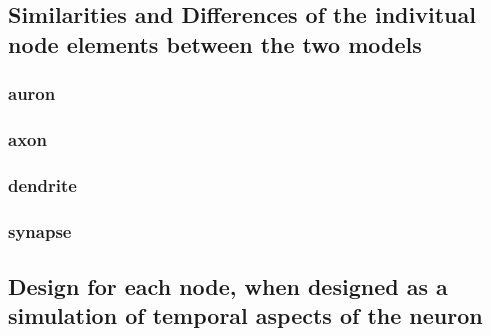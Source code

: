 	\subsection{Similarities and Differences of the indivitual node elements between the two models}
		\subsubsection{auron}
		\subsubsection{axon}
		\subsubsection{dendrite}
		\subsubsection{synapse}
	\subsection{Design for each node, when designed as a simulation of temporal aspects of the neuron}
	
